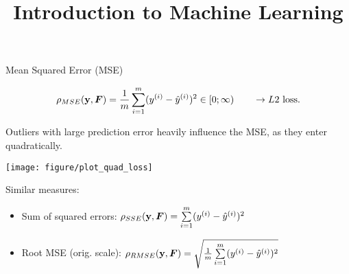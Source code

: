 \documentclass[11pt,compress,t,notes=noshow, xcolor=table]{beamer}
\title{Introduction to Machine Learning}
\begin{document}


\begin{vbframe}{Mean Squared Error (MSE)}

$$
\rho_{MSE}(\mathbf{y}, \bm{F}) = \frac{1}{m} \sum\limits_{i=1}^m (y^{(i)}- \hat{y}^{(i)})^2 \in [0;\infty) \qquad \rightarrow L2 \text{ loss}.
$$

\begin{minipage}[c]{0.33\textwidth}
  \raggedright
  \small
  Outliers with large prediction error heavily influence the MSE, as they 
  enter quadratically.
\end{minipage}%
\begin{minipage}[c]{0.67\textwidth}
  \begin{knitrout}\scriptsize
  \color{fgcolor}
  {\texttt{[image: figure/plot\_quad\_loss]}}
\end{knitrout}
\end{minipage}

\small
Similar measures:

\begin{itemize}
  \small
  \item Sum of squared errors: $\rho_{SSE}(\mathbf{y}, \bm{F})=\sum\limits_{i=1}^m (y^{(i)}- \hat{y}^{(i)})^2$
  \item Root MSE (orig. scale): $\rho_{RMSE}(\mathbf{y}, \bm{F})= \sqrt{\frac{1}{m} \sum\limits_{i=1}^m (y^{(i)}- \hat{y}^{(i)})^2}$
\end{itemize}

\end{vbframe}

\end{document}
